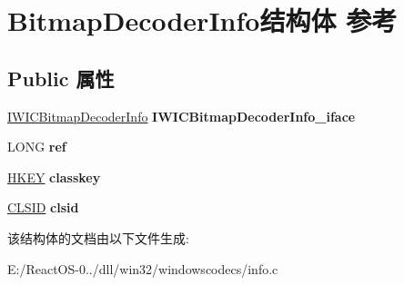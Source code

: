 \hypertarget{struct_bitmap_decoder_info}{}\section{Bitmap\+Decoder\+Info结构体 参考}
\label{struct_bitmap_decoder_info}
\subsection*{Public 属性}
\begin{DoxyCompactItemize}
\item 
\mbox{\label{struct_bitmap_decoder_info_add3804239626a811f1308d5f4a5f7481}} 
\hyperlink{interface_i_w_i_c_bitmap_decoder_info}{I\+W\+I\+C\+Bitmap\+Decoder\+Info} {\bfseries I\+W\+I\+C\+Bitmap\+Decoder\+Info\+\_\+iface}
\item 
\mbox{\label{struct_bitmap_decoder_info_afc682a0897c2d24c8c66fc30a915cc5c}} 
L\+O\+NG {\bfseries ref}
\item 
\mbox{\label{struct_bitmap_decoder_info_ad3e50787df42c24a4f37c0d7858aa7e2}} 
\hyperlink{interfacevoid}{H\+K\+EY} {\bfseries classkey}
\item 
\mbox{\label{struct_bitmap_decoder_info_a6fb6c57cff78f825685f923f3b83a49b}} 
\hyperlink{struct___i_i_d}{C\+L\+S\+ID} {\bfseries clsid}
\end{DoxyCompactItemize}


该结构体的文档由以下文件生成\+:\begin{DoxyCompactItemize}
\item 
E\+:/\+React\+O\+S-\/0../dll/win32/windowscodecs/info.\+c\end{DoxyCompactItemize}
